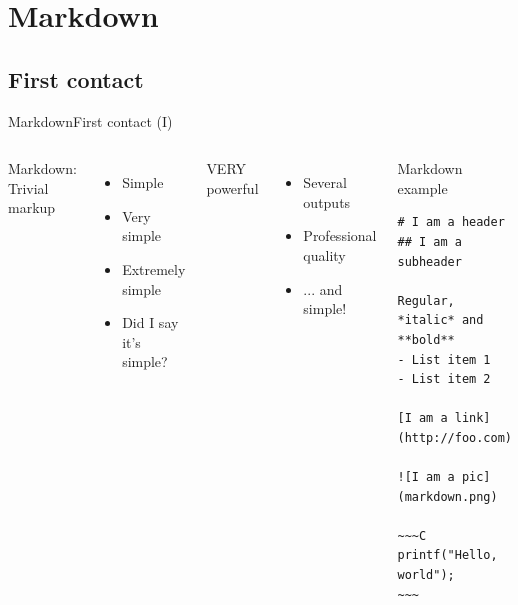 \documentclass{beamer}
\begin{document}


\section{Markdown}


\subsection{First contact}


\begin{frame}[fragile]{Markdown}{First contact (I)}
	\vspace{-0.3cm}
	\begin{columns}
	Markdown: Trivial markup
	\begin{itemize}
		\item Simple
		\item Very simple
		\item Extremely simple
		\item Did I say it's simple?
	\end{itemize}
	VERY powerful
	\begin{itemize}
		\item Several outputs
		\item Professional quality
		\item ... and simple!
	\end{itemize}
		\begin{exampleblock}{Markdown example}
			\vspace{-0.3cm}
			\begin{lstlisting}[mathescape]
# I am a header
## I am a subheader

Regular, *italic* and **bold**
- List item 1
- List item 2

[I am a link](http://foo.com)

![I am a pic](markdown.png)

~~~C
printf("Hello, world");
~~~
			\end{lstlisting}
			\vspace{-0.2cm}
		\end{exampleblock}
	\end{columns}
\end{frame}
\end{document}
